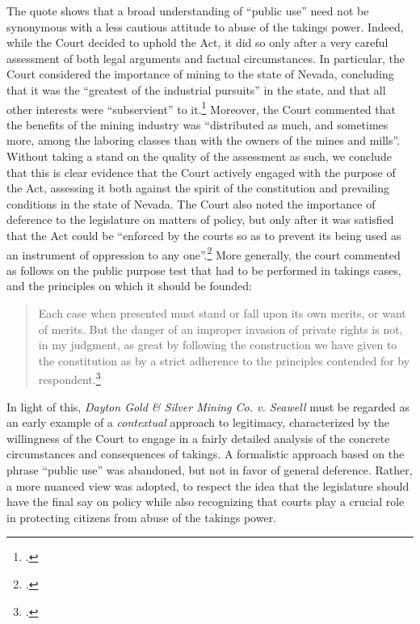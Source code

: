 The quote shows that a broad understanding of ``public use'' need not be synonymous with a less cautious attitude to abuse of the takings power. Indeed, while the Court decided to uphold the Act, it did so only after a very careful assessment of both legal arguments and factual circumstances. In particular, the Court considered the importance of mining to the state of Nevada, concluding that it was the ``greatest of the industrial pursuits'' in the state, and that all other interests were ``subservient'' to it.\footcite[398]{seawell76} Moreover, the Court commented that the benefits of the mining industry was ``distributed as much, and sometimes more, among the laboring classes than with the owners of the mines and mills''. Without taking a stand on the quality of the assessment as such, we conclude that this is clear evidence that the Court actively engaged with the purpose of the Act, assessing it both against the spirit of the constitution and prevailing conditions in the state of Nevada. The Court also noted the importance of deference to the legislature on matters of policy, but only after it was satisfied that the Act could be ``enforced by the courts so as to prevent its being used as an instrument of oppression to any one''.\footcite[400]{seawell76} More generally, the court commented as follows on the public purpose test that had to be performed in takings cases, and the principles on which it should be founded:

\begin{quote}
 Each case when presented must stand or fall upon its own merits, or want of merits. But the danger of an improper invasion of private rights is not, in my judgment, as great by following the construction we have given to the constitution as by a strict adherence to the principles contended for by respondent.\footcite[398]{seawell76}
\end{quote}

In light of this, {\it Dayton Gold \& Silver Mining Co. v. Seawell} must be regarded as an early example of a {\it contextual} approach to legitimacy, characterized by the willingness of the Court to engage in a fairly detailed analysis of the concrete circumstances and consequences of takings. A formalistic approach based on the phrase ``public use'' was abandoned, but not in favor of general deference. Rather, a more nuanced view was adopted, to respect the idea that the legislature should have the final say on policy while also recognizing that courts play a crucial role in protecting citizens from abuse of the takings power.

